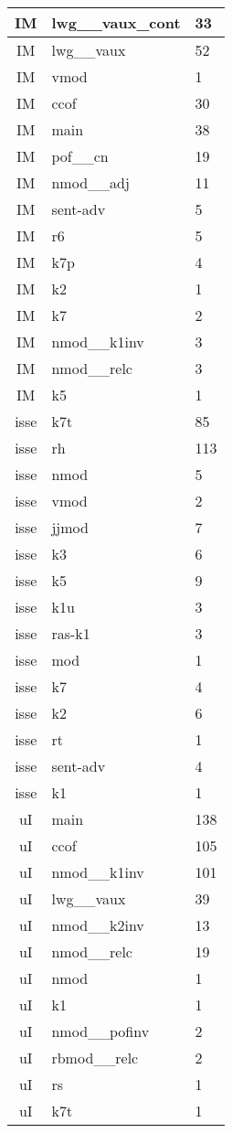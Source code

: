 \documentclass[a4 paper]{article}
\begin{document}
\begin{longtable}{cp{}p{}}
IM & lwg\_\_vaux\_cont & 33\\ \midrule IM & lwg\_\_vaux & 52\\ \midrule IM & vmod & 1\\ \midrule IM & ccof & 30\\ \midrule IM & main & 38\\ \midrule IM & pof\_\_cn & 19\\ \midrule IM & nmod\_\_adj & 11\\ \midrule IM & sent-adv & 5\\ \midrule IM & r6 & 5\\ \midrule IM & k7p & 4\\ \midrule IM & k2 & 1\\ \midrule IM & k7 & 2\\ \midrule IM & nmod\_\_k1inv & 3\\ \midrule IM & nmod\_\_relc & 3\\ \midrule IM & k5 & 1\\ \midrule 
isse & k7t & 85\\ \midrule isse & rh & 113\\ \midrule isse & nmod & 5\\ \midrule isse & vmod & 2\\ \midrule isse & jjmod & 7\\ \midrule isse & k3 & 6\\ \midrule isse & k5 & 9\\ \midrule isse & k1u & 3\\ \midrule isse & ras-k1 & 3\\ \midrule isse & mod & 1\\ \midrule isse & k7 & 4\\ \midrule isse & k2 & 6\\ \midrule isse & rt & 1\\ \midrule isse & sent-adv & 4\\ \midrule isse & k1 & 1\\ \midrule 
uI & main & 138\\ \midrule uI & ccof & 105\\ \midrule uI & nmod\_\_k1inv & 101\\ \midrule uI & lwg\_\_vaux & 39\\ \midrule uI & nmod\_\_k2inv & 13\\ \midrule uI & nmod\_\_relc & 19\\ \midrule uI & nmod & 1\\ \midrule uI & k1 & 1\\ \midrule uI & nmod\_\_pofinv & 2\\ \midrule uI & rbmod\_\_relc & 2\\ \midrule uI & rs & 1\\ \midrule uI & k7t & 1\\ \midrule 

\end{longtable}
\end{document}
